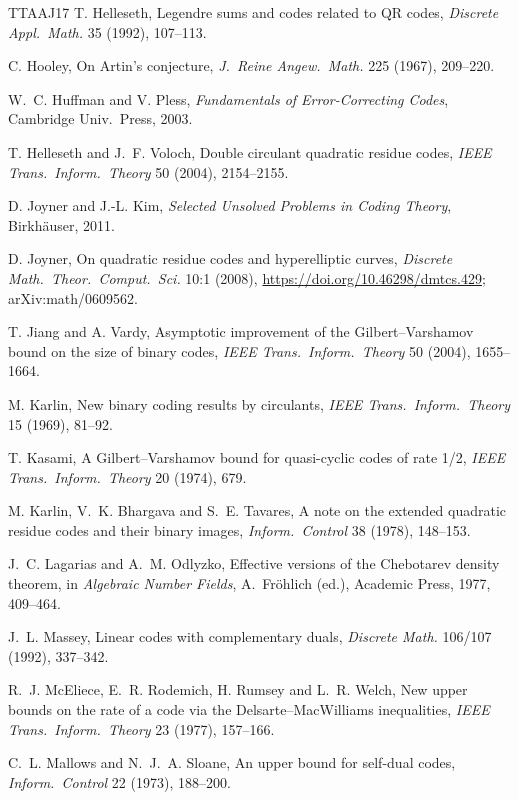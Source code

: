 \documentclass[12pt,letterpaper]{article}
\theoremstyle{definition}
\theoremstyle{remark}
\numberwithin{equation}{section}
\begin{document}
\begin{thebibliography}{TTAAJ17}
 T. Helleseth, Legendre sums and codes related to QR codes,
\emph{Discrete Appl.\ Math.} 35 (1992), 107--113.

 C. Hooley, On Artin's conjecture, \emph{J.\ Reine Angew.\ Math.}
225 (1967), 209--220.

 W.~C. Huffman and V. Pless, \emph{Fundamentals of Error-Correcting
Codes}, Cambridge Univ.\ Press, 2003.

 T. Helleseth and J.~F. Voloch, Double circulant quadratic residue
codes, \emph{IEEE Trans.\ Inform.\ Theory} 50 (2004), 2154--2155.

 D. Joyner and J.-L. Kim, \emph{Selected Unsolved Problems in Coding
Theory}, Birkh\"auser, 2011.

 D. Joyner, On quadratic residue codes and hyperelliptic curves,
\emph{Discrete Math.\ Theor.\ Comput.\ Sci.} 10:1 (2008),
\url{https://doi.org/10.46298/dmtcs.429}; arXiv:math/0609562.

 T. Jiang and A. Vardy, Asymptotic improvement of the
Gilbert--Varshamov bound on the size of binary codes, \emph{IEEE Trans.\ Inform.\
Theory} 50 (2004), 1655--1664.

 M. Karlin, New binary coding results by circulants, \emph{IEEE
Trans.\ Inform.\ Theory} 15 (1969), 81--92.

 T. Kasami, A Gilbert--Varshamov bound for quasi-cyclic codes of rate
1/2, \emph{IEEE Trans.\ Inform.\ Theory} 20 (1974), 679.

 M. Karlin, V.~K. Bhargava and S.~E. Tavares, A note on the extended
quadratic residue codes and their binary images, \emph{Inform.\ Control} 38 (1978),
148--153.

 J.~C. Lagarias and A.~M. Odlyzko, Effective versions of the
Chebotarev density theorem, in \emph{Algebraic Number Fields}, A.~Fr\"ohlich (ed.),
Academic Press, 1977, 409--464.

 J.~L. Massey, Linear codes with complementary duals, \emph{Discrete
Math.} 106/107 (1992), 337--342.

 R.~J. McEliece, E.~R. Rodemich, H. Rumsey and L.~R. Welch, New
upper bounds on the rate of a code via the Delsarte--MacWilliams inequalities,
\emph{IEEE Trans.\ Inform.\ Theory} 23 (1977), 157--166.

 C.~L. Mallows and N.~J.~A. Sloane, An upper bound for self-dual
codes, \emph{Inform.\ Control} 22 (1973), 188--200.


\end{thebibliography}
\end{document}
